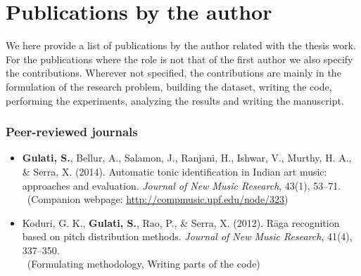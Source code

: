 \newcommand\contrib[1]{\\~{\footnotesize (#1)}}
% 
\newcommand\resource[2]{
	\noindent #1 \par
	\vspace{0.2em}
	{\centering	\url{#2} \par}
	\vspace{0.5em}
	\hrule \par 
	\vspace{0.8em} \par}
%
%
\chapter[Publications by the author][Publications by the author]{Publications by the author}\label{app:mypapers}%

We here provide a list of publications by the author related with the thesis work. For the publications where the role is not that of the first author we  also specify the contributions. Wherever not specified, the contributions are mainly in the formulation of the research problem, building the dataset, writing the code, performing the experiments, analyzing the results and writing the manuscript.

\subsection*{Peer-reviewed journals}
\begin{itemize}[leftmargin=*]
	\item \textbf{Gulati, S.}, Bellur, A., Salamon, J., Ranjani, H., Ishwar, V., Murthy, H. A., \& Serra, X. (2014). Automatic tonic identification in Indian art music: approaches and evaluation. \textit{Journal of New Music Research}, 43(1), 53–71.
	\contrib{Companion webpage: \url{http://compmusic.upf.edu/node/323}}
	\item Koduri, G. K., \textbf{Gulati, S.}, Rao, P., \& Serra, X. (2012). R\={a}ga recognition based on pitch distribution methods. \textit{Journal of New Music Research}, 41(4), 337–350.
	\contrib{Formulating methodology, Writing parts of the code}
	
\end{itemize}
%
